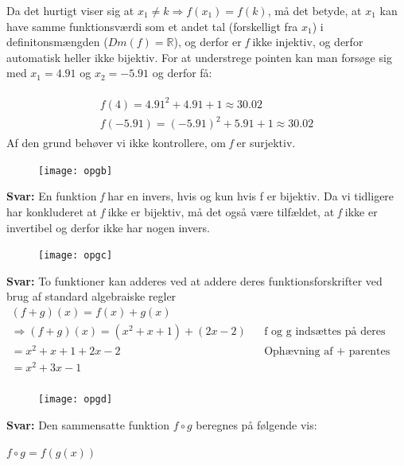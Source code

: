 \documentclass{article}
\begin{document}
Da det hurtigt viser sig at $x_1 \neq k \Rightarrow f(x_1) = f(k)$, må det betyde, at $x_1$ kan have samme funktionsværdi som et andet tal (forskelligt fra $x_1$) i definitonsmængden ($Dm(f) = \mathbb{R}$), og derfor er \emph{f} ikke injektiv, og derfor automatisk heller ikke bijektiv. For at understrege pointen kan man forsøge sig med $x_1 = 4.91$ og $x_2 = -5.91$ og derfor få:

\begin{align*}
\begin{split}
f(4) = 4.91^2 + 4.91 + 1 \approx 30.02  \\
f(-5.91) = (-5.91)^2 + 5.91 + 1 \approx 30.02
\end{split}
\end{align*}
Af den grund behøver vi ikke kontrollere, om \emph{f} er surjektiv.


\begin{figure}[h]
\texttt{[image: opgb]}
\end{figure}

\textbf{Svar:} En funktion \emph{f} har en invers, hvis og kun hvis f er bijektiv. Da vi tidligere har konkluderet at \emph{f} ikke er bijektiv, må det også være tilfældet, at \emph{f} ikke er invertibel og derfor ikke har nogen invers.

\begin{figure}[h]
\texttt{[image: opgc]}
\end{figure}
\textbf{Svar:} To funktioner kan adderes ved at addere deres funktionsforskrifter ved brug af standard algebraiske regler
\begin{align*}
(f+g)(x) = f(x) + g(x) \\
\Rightarrow (f+g)(x) = (x^2 + x + 1) + (2x - 2) && \text{f og g indsættes på deres pladser} \\
= x^2 + x + 1 + 2x - 2 && \text{Ophævning af + parentes} \\
= x^2 + 3x - 1 \\
\end{align*}

\begin{figure}[h]
\texttt{[image: opgd]}
\end{figure}
\textbf{Svar:} Den sammensatte funktion $f \circ g$ beregnes på følgende vis:

\par
\begin{center}
\begin{math}
f \circ g = f(g(x))
\end{math}
\end{center}
\end{document}
